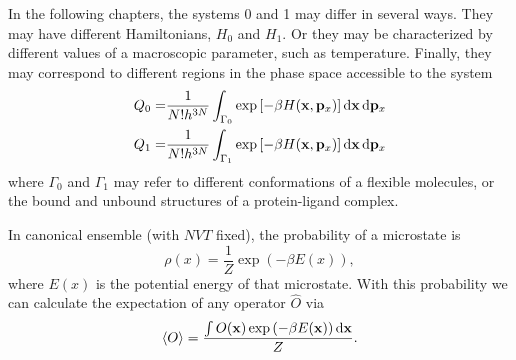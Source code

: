 In the following chapters, the systems 0 and 1 may differ in several ways. They may have different Hamiltonians, $H_0$ and $H_1$. Or they may be characterized by different values of a macroscopic parameter, such as temperature. Finally, they may correspond to different regions in the phase space accessible to the system
\begin{align}
Q_0=&\frac{1}{N!h^{3N}}\int_{\Gamma_0}\exp{\left[-\beta H(\mathbf{x},\mathbf{p}_x)\right]}\mathop{}\!\mathrm{d} \mathbf{x}\mathop{}\!\mathrm{d} \mathbf{p}_x\\
Q_1=&\frac{1}{N!h^{3N}}\int_{\Gamma_1}\exp{\left[-\beta H(\mathbf{x},\mathbf{p}_x)\right]}\mathop{}\!\mathrm{d} \mathbf{x}\mathop{}\!\mathrm{d}\mathbf{p}_x
\end{align}
where $\Gamma_0$ and $\Gamma_1$ may refer to different conformations of a flexible molecules, or the bound and unbound structures of a protein-ligand complex.

In canonical ensemble (with $NVT$ fixed), the probability of a microstate is
\begin{equation}
\rho(x)=\frac{1}{Z}\exp{(-\beta E(x))},
\end{equation}
where $E(x)$ is the potential energy of that microstate. With this probability we can calculate the expectation of any operator $\hat{O}$ via
\begin{equation}
\left<O\right>=\frac{\int O(\mathbf{x})\exp{(-\beta E(\mathbf{x}))}\mathop{}\!\mathrm{d}\mathbf{x}}{Z}.
\end{equation}

